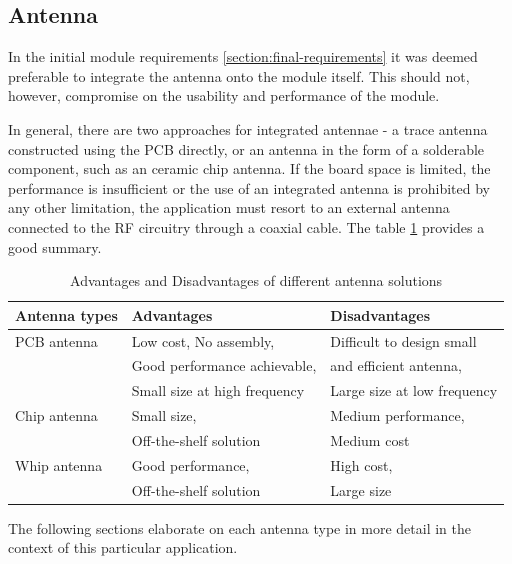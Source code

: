 \subsection{Antenna}
In the initial module requirements \ref{section:final-requirements} it was deemed preferable to integrate the antenna onto the module itself. This should not, however, compromise on the usability and performance of the module. 

In general, there are two approaches for integrated antennae - a trace antenna constructed using the PCB directly, or an antenna in the form of a solderable component, such as an ceramic chip antenna. If the board space is limited, the performance is insufficient or the use of an integrated antenna is prohibited by any other limitation, the application must resort to an external antenna connected to the RF circuitry through a coaxial cable. The table \ref{table:antenna-solutions} provides a good summary.

\begin{table}[H]
\begin{center}
\caption{\label{table:antenna-solutions}Advantages and Disadvantages of different antenna solutions \cite{andersen_selecting_2008}}
    \begin{tabular}{|l|l|l|}
    \hline
    \textbf{Antenna types} & \textbf{Advantages} & \textbf{Disadvantages} \\
    \hline
    PCB antenna  & Low cost, No assembly,        & Difficult to design small \\
                 & Good performance achievable,  & and efficient antenna, \\
                 & Small size at high frequency  & Large size at low frequency \\
    \hline
    Chip antenna & Small size,                   & Medium performance, \\
                 & Off-the-shelf solution        & Medium cost \\
    \hline
    Whip antenna & Good performance,             & High cost, \\
                 & Off-the-shelf solution        & Large size \\
    \hline
    \end{tabular}
\end{center}
\end{table}

The following sections elaborate on each antenna type in more detail in the context of this particular application. 

